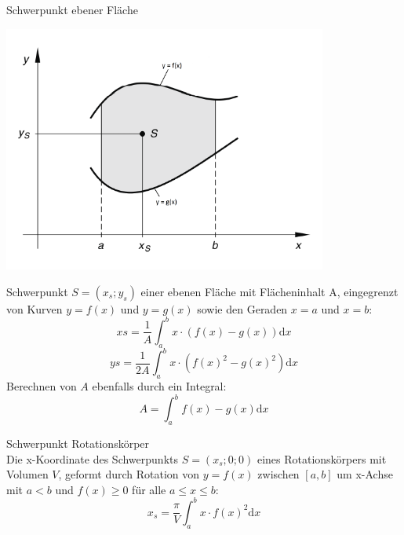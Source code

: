\begin{theorem}{Schwerpunkt ebener Fläche}\\
  \begin{centering}
  \includegraphics[width=0.8\textwidth]{images/Schwerpunkt_Beispiel.png}\\
  \end{centering}
Schwerpunkt \(S=(x_s;y_s)\) einer ebenen Fläche mit Flächeninhalt A, eingegrenzt von Kurven \(y=f(x)\) und \(y=g(x)\)
sowie den Geraden \(x=a\) und \(x=b\):
\[xs = \frac{1}{A}\int_a^b{x\cdot(f(x)-g(x))\mathrm{d}x} \]
\[ys = \frac{1}{2A}\int_a^b{x\cdot(f(x)^2-g(x)^2)\mathrm{d}x} \]
Berechnen von \(A\) ebenfalls durch ein Integral:
\[A=\int_a^b{f(x)-g(x)\mathrm{d}x} \]
\end{theorem}
\begin{theorem}{Schwerpunkt Rotationskörper}\\
    Die x-Koordinate des Schwerpunkts \(S=(x_s;0;0) \) eines Rotationskörpers mit Volumen \(V\), geformt durch Rotation
    von \(y=f(x)\) zwischen \([a,b]\) um x-Achse mit \(a<b\) und \(f(x) \ge 0 \) für alle \(a \le x \le b \):
    \[x_s = \frac{\pi}{V}\int_a^b{x\cdot f(x)^2\mathrm{d}x} \]
\end{theorem}
